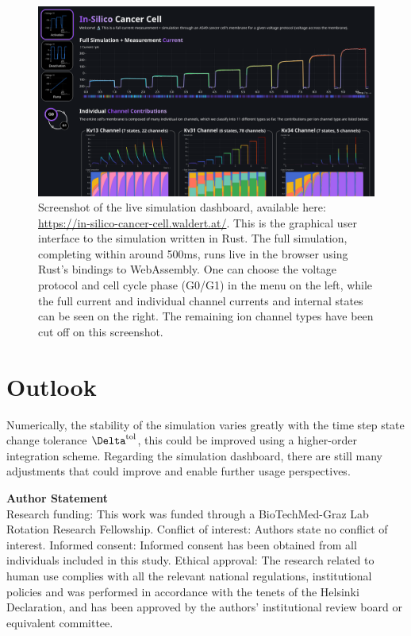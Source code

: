 \documentclass[USenglish,twocolumn]{article}
\begin{document}
  \begin{figure}[h]
    \includegraphics[width=\textwidth]{../figures/above-the-fold-screenshot.png}
    \caption{Screenshot of the live simulation dashboard, available here: \url{https://in-silico-cancer-cell.waldert.at/}. This is the graphical user interface to the simulation written in Rust. The full simulation, completing within around 500ms, runs live in the browser using Rust's bindings to WebAssembly. One can choose the voltage protocol and cell cycle phase (G0/G1) in the menu on the left, while the full current and individual channel currents and internal states can be seen on the right. The remaining ion channel types have been cut off on this screenshot.}
    \label{figure:screenshot}
  \end{figure}

  \section{Outlook}
  Numerically, the stability of the simulation varies greatly with the time step state change tolerance $\Delta^{\rm tol}$, this could be improved using a higher-order integration scheme.
  Regarding the simulation dashboard, there are still many adjustments that could improve and enable further usage perspectives.

  \vspace{1cm}


  \textsf{\textbf{Author Statement}}\\
  Research funding: This work was funded through a BioTechMed-Graz Lab Rotation Research Fellowship.
  Conflict of interest: Authors state no conflict of interest.
  Informed consent: Informed consent has been obtained from all individuals included in this study.
  Ethical approval: The research related to human use complies with all the relevant national regulations, institutional policies and was performed in accordance with the tenets of the Helsinki Declaration, and has been approved by the authors' institutional review board or equivalent committee.

  \printbibliography
\end{document}
